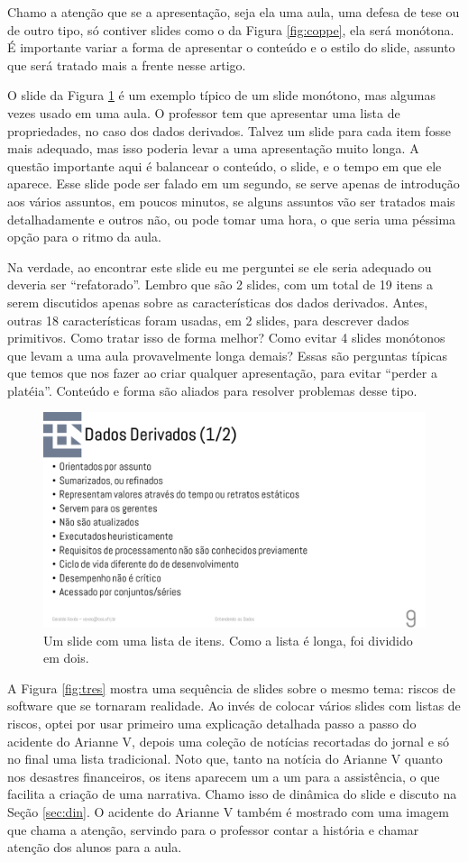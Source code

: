 Chamo a atenção que se a apresentação, seja ela uma aula, uma defesa de tese ou de outro tipo, só contiver slides como o da Figura \ref{fig:coppe}, ela será monótona. É importante variar a forma de apresentar o conteúdo e o estilo do slide, assunto que será tratado mais a frente nesse artigo.

O slide da Figura \ref{fig:dados} é um exemplo típico de um slide monótono, mas algumas vezes usado em uma aula. O professor tem que apresentar uma lista de propriedades, no caso dos dados derivados. Talvez um slide para cada item fosse mais adequado, mas isso poderia levar a uma apresentação muito longa. A questão importante aqui é balancear o conteúdo, o slide, e o tempo em que ele aparece. Esse slide pode ser falado em um segundo, se serve apenas de introdução aos vários assuntos, em poucos minutos, se alguns assuntos vão ser tratados mais detalhadamente e outros não, ou pode tomar uma hora, o que seria uma péssima opção para o ritmo da aula.

Na verdade, ao encontrar este slide eu me perguntei se ele seria adequado ou deveria ser ``refatorado''. Lembro que são 2 slides, com um total de 19 itens a serem discutidos apenas sobre as características dos dados derivados. Antes, outras 18 características foram usadas, em 2 slides, para descrever dados primitivos. Como tratar isso de forma melhor? Como evitar 4 slides monótonos que levam a uma aula provavelmente longa demais? Essas são perguntas típicas que temos que nos fazer ao criar qualquer apresentação, para evitar ``perder a platéia''. Conteúdo e forma são aliados para resolver problemas desse tipo.

\begin{figure}[tbh]
    \centering
    \includegraphics[width=0.7\linewidth]{imagens/dados}
    \caption{Um slide com uma lista de itens. Como a lista é longa, foi dividido em dois.}
    \label{fig:dados}
\end{figure}


A Figura \ref{fig:tres} mostra uma sequência de slides sobre o mesmo tema: riscos de software que se tornaram realidade. Ao invés de colocar vários slides com listas de riscos, optei por usar primeiro uma explicação detalhada passo a passo do acidente do Arianne V, depois uma coleção de notícias recortadas do jornal e só no final uma lista tradicional. Noto que, tanto na notícia do Arianne V quanto nos desastres financeiros, os itens aparecem um a um para a assistência, o que facilita a criação de uma narrativa. Chamo isso de dinâmica do slide e discuto na Seção \ref{sec:din}. O acidente do Arianne V também é mostrado com uma imagem que chama a atenção, servindo para o professor contar a história e chamar atenção dos alunos para a aula.

